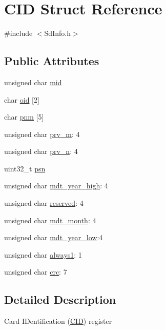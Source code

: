 \hypertarget{struct_c_i_d}{}\section{C\+ID Struct Reference}
\label{struct_c_i_d}


{\ttfamily \#include $<$Sd\+Info.\+h$>$}

\subsection*{Public Attributes}
\begin{DoxyCompactItemize}
\item 
unsigned char \hyperlink{struct_c_i_d_aa77436aa64a8a0e80573ade765039d2f}{mid}
\item 
char \hyperlink{struct_c_i_d_a12cb950aa46c62c8af1e530006f97031}{oid} \mbox{[}2\mbox{]}
\item 
char \hyperlink{struct_c_i_d_a6484cd56fc4bacfa815c12d8682129ba}{pnm} \mbox{[}5\mbox{]}
\item 
unsigned char \hyperlink{struct_c_i_d_a142fd792bb74d7af1f0fb62833ae053b}{prv\+\_\+m}\+: 4
\item 
unsigned char \hyperlink{struct_c_i_d_ae50f389a50daf99d15d1ea7ce2d426cf}{prv\+\_\+n}\+: 4
\item 
uint32\+\_\+t \hyperlink{struct_c_i_d_ada215f8541fa46078461d8da9574fc5e}{psn}
\item 
unsigned char \hyperlink{struct_c_i_d_a6b16c5e74b48af39036aa831fca4cb46}{mdt\+\_\+year\+\_\+high}\+: 4
\item 
unsigned char \hyperlink{struct_c_i_d_a7d489455802a3a9728a5cec60927a7c7}{reserved}\+: 4
\item 
unsigned char \hyperlink{struct_c_i_d_a60e35d4b824da135dc2a9197c5544929}{mdt\+\_\+month}\+: 4
\item 
unsigned char \hyperlink{struct_c_i_d_afe44a84b416bea68dea9bad27c172c3d}{mdt\+\_\+year\+\_\+low}\+:4
\item 
unsigned char \hyperlink{struct_c_i_d_ae9d4ba51ed4102255aa87bb92882f119}{always1}\+: 1
\item 
unsigned char \hyperlink{struct_c_i_d_aa10cfc5aef8e979e47009474dfa3d940}{crc}\+: 7
\end{DoxyCompactItemize}


\subsection{Detailed Description}
Card I\+Dentification (\hyperlink{struct_c_i_d}{C\+ID}) register 

